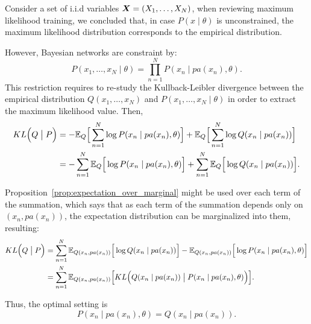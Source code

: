 
Consider a set of i.i.d variables \(\bm{X} = (X_{1},\dots,X_{N})\), when reviewing maximum likelihood training, we concluded that, in case \(P(x \mid \theta)\) is unconstrained, the maximum likelihood distribution corresponds to the empirical distribution.

However, Bayesian networks are constraint by:
 \[
   P(x_{1}, \dots, x_{N} \mid \theta) = \prod_{n = 1}^N P(x_n  \mid  pa(x_n), \theta).
 \]
This restriction requires to re-study the Kullback-Leibler divergence between the empirical
 distribution \(Q(x_1,\dots,x_N)\) and \(P(x_1, \dots, x_N \mid \theta)\) in order to extract the maximum likelihood value. Then,
 \[
   \begin{aligned}
   KL\Big(Q \bigm| P\Big) &= - \mathbb{E}_{Q}\Big[\sum_{n = 1}^N\log{P(x_n \mid pa(x_n), \theta)}\Big] +
   \mathbb{E}_{Q}\Big[\sum_{n = 1}^N\log{Q(x_n \mid pa(x_n))}\Big]
   \\ &= - \sum_{n = 1}^N \mathbb{E}_{Q}\Big[\log{P(x_n \mid pa(x_n), \theta)}\Big] + \sum_{n =
     1}^N \mathbb{E}_{Q}\Big[\log{Q(x_n \mid pa(x_n))}\Big].
   \end{aligned}
 \]

Proposition~\ref{prop:expectation_over_marginal} might be used over each term of the summation, which says that as each term of the summation depends only on \((x_{n}, pa(x_{n}))\), the expectation distribution can be marginalized into them, resulting:
 \[
   \begin{aligned}
     KL\Big(Q \bigm| P\Big) &= \sum_{n = 1}^N \mathbb{E}_{Q(x_n,pa(x_n))}\Big[\log{Q(x_n \mid pa(x_n))}\Big] - \mathbb{E}_{Q(x_n,pa(x_n))}\Big[\log{P(x_n \mid pa(x_n), \theta)}\Big]\\
     &= \sum_{n = 1}^N \mathbb{E}_{Q(x_n,pa(x_n))}\Big[KL\Big(Q(x_n \mid pa(x_n)) \bigm| P(x_n \mid pa(x_n), \theta)\Big)\Big].
   \end{aligned}
 \]

 Thus, the optimal setting is
 \[
   P(x_n \mid pa(x_n), \theta) = Q(x_n \mid pa(x_n)).
 \]
